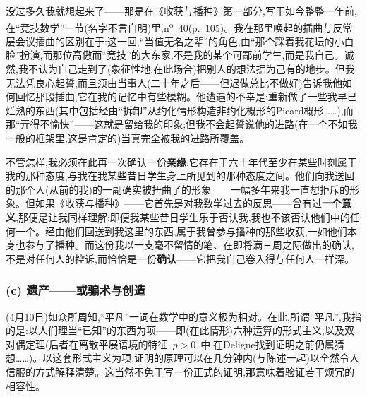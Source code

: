 没过多久我就想起来了——那是在《收获与播种》第一部分,写于如今整整一年前,在“竞技数学”一节(名字不言自明)里,n\textsuperscript{o}~40(p.~105)。我在那里唤起的插曲与反常层会议插曲的区别在于:这一回,“当值无名之辈”的角色,由“那个踩着我花坛的小白脸”扮演,而那位高傲而“竞技”的大东家,不是我的某个可鄙前学生,而是我自己。诚然,我不认为自己走到了(象征性地,在此场合)把别人的想法据为己有的地步。但我无法凭良心起誓,而且须由当事人(二十年之后——但迟做总比不做好)告诉我\textbf{他}如何回忆那段插曲,它在我的记忆中有些模糊。他遭遇的不幸是:重新做了一些我早已烂熟的东西(其中包括经由“拆卸”从约化情形构造非约化概形的Picard概形……),而那“弄得不愉快”——这就是\dmark{}留给我的印象;但我不会起誓说他的进路(在一个不如我一般的框架里,这是肯定的)当真完全被我的进路所覆盖。

不管怎样,我必须在此再一次确认一份\textbf{亲缘}:它存在于六十年代至少在某些时刻属于我的那种态度,与我在我某些昔日学生身上所见到的那种态度之间。他们向我送回的那个人(从前的我)的一副确实被扭曲了的形象——一幅多年来我一直想拒斥的形象。但如果《收获与播种》——它首先是对我数学过去的反思——曾有过\textbf{一个意义},那便是让我同样理解:即便我某些昔日学生乐于否认我,我也不该否认他们中的任何一个。经由他们回送到我这里的东西,属于我曾参与播种的那些收获,一如他们本身也参与了播种。而这份我以一支毫不留情的笔、在即将满三周之际做出的确认,不是对任何人的控诉,而恰恰是一份\textbf{确认}——它把我自己卷入得与任何人一样深。

\subsubsection*{(c) 遗产——或骗术与创造}


(4月10日)如众所周知,“平凡”一词在数学中的意义极为相对。在此,所谓“平凡”,我指的是:以人们理当“已知”的东西为项——即(在此情形)六种运算的形式主义,以及双对偶定理(后者在离散平展语境的特征~$p>0$~中,在Deligne找到证明之前仍属猜想……)。以这套形式主义为项,证明的原理可以在几分钟内(与陈述一起)以全然令人信服的方式\dmark{}解释清楚。这当然不免于写一份正式的证明,那意味着验证若干烦冗的相容性。

